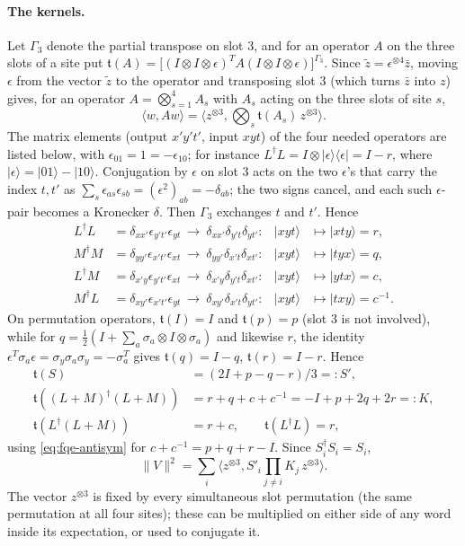 \paragraph{The kernels.} Let \(\Gamma_3\) denote the partial transpose on slot \(3\), and for an
operator \(A\) on the three slots of a site put
\(\mathfrak t(A)=\bigl[(I\otimes I\otimes\epsilon)^TA(I\otimes I\otimes\epsilon)\bigr]^{\Gamma_3}\). Since
\(\tilde z=\epsilon^{\otimes4}\bar z\), moving \(\epsilon\) from the vector \(\tilde z\) to the operator and
transposing slot \(3\) (which turns \(\bar z\) into \(z\)) gives, for an operator
\(A=\bigotimes_{s=1}^4A_s\) with \(A_s\) acting on the three slots of site \(s\),
\[
\langle w,Aw\rangle=\langle z^{\otimes3},\textstyle\bigotimes_s\mathfrak t(A_s)\,z^{\otimes3}\rangle .
\]
The matrix elements (output \(x'y't'\), input \(xyt\)) of the four needed operators are listed below, with
\(\epsilon_{01}=1=-\epsilon_{10}\); for instance \(L^\dagger L=I\otimes|\epsilon\rangle\langle\epsilon|=I-r\),
where \(|\epsilon\rangle=|01\rangle-|10\rangle\). Conjugation by \(\epsilon\) on slot \(3\) acts on the two
\(\epsilon\)'s that carry the index \(t,t'\) as \(\sum_s\epsilon_{as}\epsilon_{sb}=(\epsilon^2)_{ab}=-\delta_{ab}\);
the two signs cancel, and each such \(\epsilon\)-pair becomes a Kronecker \(\delta\). Then \(\Gamma_3\) exchanges
\(t\) and \(t'\). Hence \[
\begin{aligned}
L^\dagger L&=\delta_{xx'}\epsilon_{y't'}\epsilon_{yt}\ \to\ \delta_{xx'}\delta_{y't}\delta_{yt'}:
&|xyt\rangle&\mapsto|xty\rangle=r,\\
M^\dagger M&=\delta_{yy'}\epsilon_{x't'}\epsilon_{xt}\ \to\ \delta_{yy'}\delta_{x't}\delta_{xt'}:
&|xyt\rangle&\mapsto|tyx\rangle=q,\\
L^\dagger M&=\delta_{x'y}\epsilon_{y't'}\epsilon_{xt}\ \to\ \delta_{x'y}\delta_{y't}\delta_{xt'}:
&|xyt\rangle&\mapsto|ytx\rangle=c,\\
M^\dagger L&=\delta_{xy'}\epsilon_{x't'}\epsilon_{yt}\ \to\ \delta_{xy'}\delta_{x't}\delta_{yt'}:
&|xyt\rangle&\mapsto|txy\rangle=c^{-1}.
\end{aligned}
\] On permutation operators, \(\mathfrak t(I)=I\) and \(\mathfrak t(p)=p\) (slot \(3\) is not involved), while for
\(q=\tfrac12(I+\sum_a\sigma_a\otimes I\otimes\sigma_a)\) and likewise \(r\), the identity
\(\epsilon^T\sigma_a\epsilon=\sigma_y\sigma_a\sigma_y=-\sigma_a^T\) gives \(\mathfrak t(q)=I-q\),
\(\mathfrak t(r)=I-r\). Hence \[
\begin{aligned}
\mathfrak t(S)&=(2I+p-q-r)/3=:S',\\
\mathfrak t((L+M)^\dagger(L+M))&=r+q+c+c^{-1}=-I+p+2q+2r=:K,\\
\mathfrak t(L^\dagger(L+M))&=r+c,\qquad
\mathfrak t(L^\dagger L)=r, \end{aligned}\tag{K}\label{eq:fqe-kernels}
\] using \eqref{eq:fqe-antisym} for \(c+c^{-1}=p+q+r-I\). Since \(S_i^\dagger S_i=S_i\), \[
\|V\|^2=\sum_i\bigl\langle z^{\otimes3},S'_i\textstyle\prod_{j\ne i}K_j\,z^{\otimes3}\bigr\rangle .
\]
The vector \(z^{\otimes3}\) is fixed by every simultaneous slot permutation (the same permutation at all
four sites); these can be multiplied on either side of any word inside its expectation, or used to
conjugate it.

